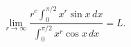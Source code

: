 \[
\lim_{r\to\infty} \frac{r^c \int_0^{\pi/2} x^r \sin x \,dx}{\int_0^{\pi/2} x^r \cos x \,dx} = L.
\]
